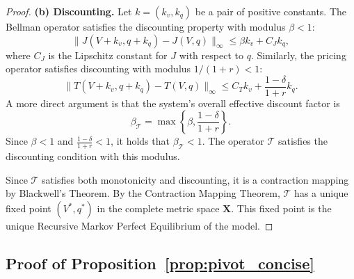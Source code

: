 \documentclass[12pt]{article}
\theoremstyle{plain}
\begin{document}
\begin{proof}
	\textbf{(b) Discounting.} Let $k=(k_v, k_q)$ be a pair of positive constants.
	The Bellman operator satisfies the discounting property with modulus $\beta < 1$:
	\begin{equation*}
		\| J(V+k_v, q+k_q) - J(V,q) \|_\infty \le \beta k_v + C_J k_q,
	\end{equation*}
	where $C_J$ is the Lipschitz constant for $J$ with respect to $q$. Similarly, the pricing operator satisfies discounting with modulus $1/(1+r) < 1$:
	\begin{equation*}
		\| T(V+k_v, q+k_q) - T(V,q) \|_\infty \le C_T k_v + \frac{1-\delta}{1+r} k_q.
	\end{equation*}
	A more direct argument is that the system's overall effective discount factor is \[\beta_{\mathcal{T}} = \max\left\{\beta, \frac{1-\delta}{1+r}\right\}.\] Since $\beta < 1$ and $\frac{1-\delta}{1+r} < 1$, it holds that
	$\beta_{\mathcal{T}} < 1$. The operator $\mathcal{T}$ satisfies the discounting
	condition with this modulus.

	Since $\mathcal{T}$ satisfies both monotonicity and discounting, it is a
	contraction mapping by Blackwell's Theorem. By the Contraction Mapping Theorem,
	$\mathcal{T}$ has a unique fixed point $(V^*, q^*)$ in the complete metric
	space $\mathbf{X}$. This fixed point is the unique Recursive Markov Perfect
	Equilibrium of the model.
\end{proof}

\subsection{Proof of Proposition~\ref{prop:pivot_concise}}\label{app:proof_pivot_concise}
\end{document}
